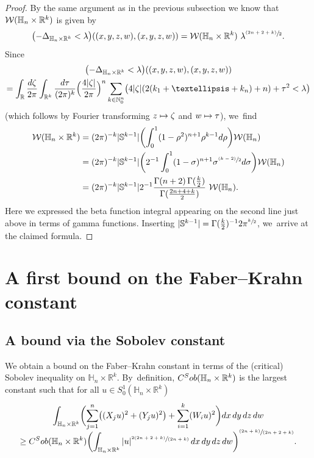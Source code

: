 \documentclass[11pt]{article}
\newcommand\mto{\mathchoice{\longmapsto}{\mapsto}{\mapsto}{\mapsto}}
\let\oldsfrac\sfrac
\renewcommand{\sfrac}[2]{{\oldsfrac{#1}{#2}}}
\newcommand{\psfrac}[2]{{\sfrac{(#1)}{#2}}}
\newcommand{\spfrac}[2]{{\sfrac{#1}{(#2)}}}
\newcommand{\pspfrac}[2]{{\sfrac{(#1)}{(#2)}}}
\newcommand{\Sob}{\textup{Sob}}
\theoremstyle{definition}
\newcommand{\1}{\mathbbm{1}}
\newcommand{\N}{\mathbb{N}}
\newcommand{\R}{\mathbb{R}}
\newcommand{\Sph}{\mathbb{S}}
\numberwithin{equation}{section}
\begin{document}
\begin{proof}
By the same argument as in the previous subsection we know that $\mathcal W(\mathbb H_n\times\nobreak\R^k)$ is given by\vspace*{-3pt}
\begin{equation*}
\1\bigl(-\Delta_{\mathbb H_n\times \mathbb R^k}<\lambda\bigr)((x,y,z,w),(x,y,z,w))=\mathcal W(\mathbb H_n\times\R^k)\ \lambda^{\psfrac{2n+2+k}{2}}.
\end{equation*}
Since\vspace*{-3pt}
\begin{multline*}
\1\bigl(-\Delta_{\mathbb H_n\times \mathbb R^k}<\lambda\bigr)((x,y,z,w),(x,y,z,w)) \\
= \int_\R \frac{d\zeta}{2\pi} \int_{\R^k} \frac{d\tau}{(2\pi)^k} \Bigl(\frac{4|\zeta|}{2\pi}\Bigr)^n \sum_{k \in\N_0^n} \1\bigl(4|\zeta|(2(k_1+\ldots+k_n)+n)+ \tau^2<\lambda\bigr)
\end{multline*}
(which follows by Fourier transforming $z\mto \zeta$ and $w\mto \tau$), we~find\vspace*{-3pt}
\begin{align*}\label{sp2}
\mathcal W(\mathbb H_n\times\R^k) & = (2\pi)^{ - k} |\Sph^{k-1}| \biggl(\int_0^1(1-\rho^2)^{n+1} \rho^{k-1} d\rho\biggr) \mathcal W(\mathbb H_n) \\
& = (2\pi)^{ - k} |\Sph^{k-1}| \biggl(2^{-1} \int_0^1(1-\sigma)^{n+1} \sigma^{\psfrac{k-2}2} d\sigma \biggr) \mathcal W(\mathbb H_n) \\
& = (2\pi)^{ - k} |\Sph^{k-1}| 2^{-1} \frac{\Gamma(n+2)\,\Gamma(\frac k2)}{\Gamma(\frac{2n+4+k}{2})} \ \mathcal W(\mathbb H_n).
\end{align*}
Here we expressed the beta function integral appearing on the second line just above in terms of gamma functions. Inserting $|\Sph^{k-1}| = \Gamma(\frac k2)^{-1} 2 \pi^{\sfrac k2}$, we~arrive at the claimed formula.
\end{proof}

\section{A first bound on the Faber--Krahn constant}\label{sec:fksob}

\subsection{A bound via the Sobolev constant}
We obtain a bound on the Faber--Krahn constant in terms of the (critical) Sobolev inequality on $\mathbb H_n\times\R^k$. By~definition, $C^\Sob(\mathbb H_n\times\R^k)$ is the largest constant such that for all $u\in S^1_0(\mathbb H_n\times\R^k)$\vspace*{-3pt}
\begin{multline*}
\int_{\mathbb H_n\times\R^k} \biggl(\sum_{j=1}^n \bigl((X_ju)^2 + (Y_ju)^2\bigr) + \sum_{i=1}^k (W_iu)^2\biggr) dx\,dy\,dz\,dw \\[-5pt]
\geq C^\Sob(\mathbb H_n\times\R^k) \biggl(\int_{\mathbb H_n\times\R^k} |u|^{\spfrac{2(2n+2+k)}{2n+k}} \,dx\,dy\,dz\,dw \biggr)^{\pspfrac{2n+k}{2n+2+k}}.
\end{multline*}
\end{document}
